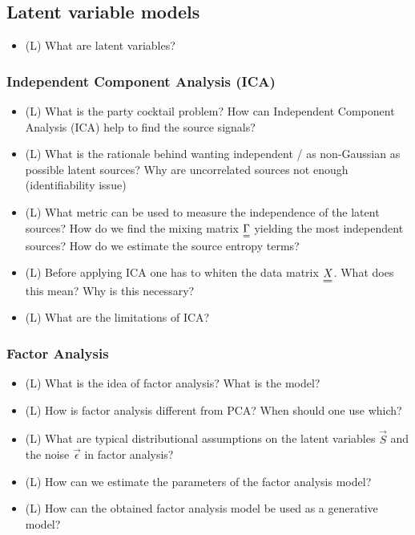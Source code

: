 \subsection*{Latent variable models}

\begin{itemize}
    \item (L) What are latent variables?
    \answerboxS
\end{itemize}

\subsubsection*{Independent Component Analysis (ICA)}

\begin{itemize}
    \item (L) What is the party cocktail problem? How can Independent Component Analysis (ICA) help to find the source signals?
    \answerboxM
    \item (L) What is the rationale behind wanting independent / as non-Gaussian as possible latent sources? Why are uncorrelated sources not enough (identifiability issue)
    \answerboxM
    \item (L) What metric can be used to measure the independence of the latent sources? How do we find the 
    mixing matrix $\mat{\Gamma}$ yielding the most independent sources? How do we estimate the source entropy terms?
    \answerboxM
    \item (L) Before applying ICA one has to whiten the data matrix $\mat{X}$. What does this mean? Why is this necessary?
    \answerboxM
    \item (L) What are the limitations of ICA?
    \answerboxM
\end{itemize}

\subsubsection*{Factor Analysis}
\begin{itemize}
    \item (L) What is the idea of factor analysis? What is the model?
    \answerboxM
    \item (L) How is factor analysis different from PCA? When should one use which?
    \answerboxM
    \item (L) What are typical distributional assumptions on the latent variables $\vec{S}$ and 
    the noise $\vec{\epsilon}$ in factor analysis?
    \answerboxM
    \item (L) How can we estimate the parameters of the factor analysis model?
    \answerboxM
    \item (L) How can the obtained factor analysis model be used as a generative model?
    \answerboxM
\end{itemize}

